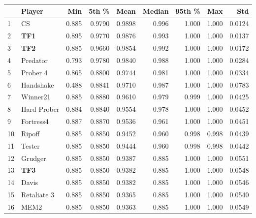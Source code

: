 \begin{tabular}{llrrrrrrr}
\toprule
{} &       Player &    Min &   5th \% &    Mean &  Median &  95th \% &    Max &     Std \\
\midrule
1  &           CS &  0.885 &  0.9790 &  0.9898 &   0.996 &   1.000 &  1.000 &  0.0124 \\
2  &          \textbf{TF1} &  0.895 &  0.9770 &  0.9876 &   0.993 &   1.000 &  1.000 &  0.0137 \\
3  &          \textbf{TF2} &  0.885 &  0.9660 &  0.9854 &   0.992 &   1.000 &  1.000 &  0.0172 \\
4  &     Predator &  0.793 &  0.9780 &  0.9840 &   0.988 &   1.000 &  1.000 &  0.0284 \\
5  &     Prober 4 &  0.865 &  0.8800 &  0.9744 &   0.981 &   1.000 &  1.000 &  0.0334 \\
6  &    Handshake &  0.488 &  0.8841 &  0.9710 &   0.987 &   1.000 &  1.000 &  0.0783 \\
7  &     Winner21 &  0.885 &  0.8880 &  0.9610 &   0.979 &   0.999 &  1.000 &  0.0425 \\
8  &  Hard Prober &  0.884 &  0.8840 &  0.9554 &   0.978 &   1.000 &  1.000 &  0.0452 \\
9  &    Fortress4 &  0.887 &  0.8870 &  0.9536 &   0.961 &   1.000 &  1.000 &  0.0451 \\
10 &       Ripoff &  0.885 &  0.8850 &  0.9452 &   0.960 &   0.998 &  0.998 &  0.0439 \\
11 &       Tester &  0.885 &  0.8850 &  0.9444 &   0.960 &   0.998 &  0.998 &  0.0442 \\
12 &      Grudger &  0.885 &  0.8850 &  0.9387 &   0.885 &   1.000 &  1.000 &  0.0551 \\
13 &          \textbf{TF3} &  0.885 &  0.8850 &  0.9382 &   0.885 &   1.000 &  1.000 &  0.0548 \\
14 &        Davis &  0.885 &  0.8850 &  0.9382 &   0.885 &   1.000 &  1.000 &  0.0546 \\
15 &  Retaliate 3 &  0.885 &  0.8850 &  0.9365 &   0.885 &   1.000 &  1.000 &  0.0540 \\
16 &         MEM2 &  0.885 &  0.8850 &  0.9363 &   0.885 &   1.000 &  1.000 &  0.0549 \\
\bottomrule
\end{tabular}
